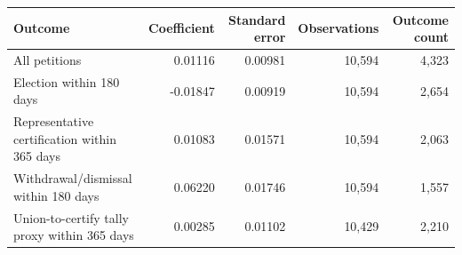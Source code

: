 \begin{tabular}{lrrrr}
\toprule
Outcome & Coefficient & Standard error & Observations & Outcome count \\
\midrule
All petitions & 0.01116 & 0.00981 & 10,594 & 4,323 \\
Election within 180 days & -0.01847 & 0.00919 & 10,594 & 2,654 \\
Representative certification within 365 days & 0.01083 & 0.01571 & 10,594 & 2,063 \\
Withdrawal/dismissal within 180 days & 0.06220 & 0.01746 & 10,594 & 1,557 \\
Union-to-certify tally proxy within 365 days & 0.00285 & 0.01102 & 10,429 & 2,210 \\
\bottomrule
\end{tabular}
